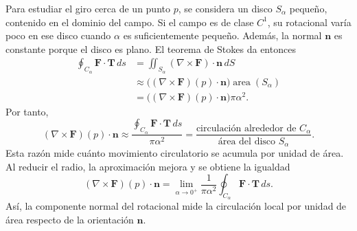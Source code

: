 \begin{center}
\begin{minipage}{.94\textwidth}
\centering
\begingroup\shorthandoff{>}
\endgroup
\end{minipage}
\end{center}

Para estudiar el giro cerca de un punto $p$, se considera un disco $S_\alpha$ pequeño, contenido en el dominio del campo. Si el campo es de clase $C^1$, su rotacional varía poco en ese disco cuando $\alpha$ es suficientemente pequeño. Además, la normal $\mathbf n$ es constante porque el disco es plano. El teorema de Stokes da entonces
\begin{align*}
\oint_{C_\alpha}\mathbf F\cdot\mathbf T\,ds
&=\iint_{S_\alpha}(\nabla\times\mathbf F)\cdot\mathbf n\,dS\\
&\approx \bigl((\nabla\times\mathbf F)(p)\cdot\mathbf n\bigr)
\operatorname{area}(S_\alpha)\\
&=\bigl((\nabla\times\mathbf F)(p)\cdot\mathbf n\bigr)\pi\alpha^2.
\end{align*}
Por tanto,
\[
(\nabla\times\mathbf F)(p)\cdot\mathbf n
\approx\frac{\displaystyle\oint_{C_\alpha}\mathbf F\cdot\mathbf T\,ds}
{\pi\alpha^2}
=\frac{\text{circulación alrededor de }C_\alpha}
{\text{área del disco }S_\alpha}.
\]
Esta razón mide cuánto movimiento circulatorio se acumula por unidad de área. Al reducir el radio, la aproximación mejora y se obtiene la igualdad
\[
(\nabla\times\mathbf F)(p)\cdot\mathbf n
=\lim_{\alpha\to0^+}\frac{1}{\pi\alpha^2}
\oint_{C_\alpha}\mathbf F\cdot\mathbf T\,ds.
\]
Así, la componente normal del rotacional mide la circulación local por unidad de área respecto de la orientación $\mathbf n$.

